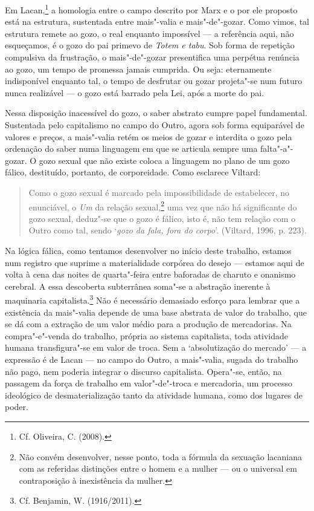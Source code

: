 Em Lacan,\footnote{Cf. Oliveira, C. (2008).} a homologia entre o campo
descrito por Marx e o por ele proposto está na estrutura, sustentada
entre mais"-valia e mais"-de"-gozar. Como vimos, tal estrutura remete ao
gozo, o real enquanto impossível --- a referência aqui, não esqueçamos, é
o gozo do pai primevo de \emph{Totem e tabu}. Sob forma de repetição
compulsiva da frustração, o mais"-de"-gozar presentifica uma perpétua
renúncia ao gozo, um tempo de promessa jamais cumprida. Ou seja:
eternamente indisponível enquanto tal, o tempo de desfrutar ou gozar
projeta"-se num futuro nunca realizável --- o gozo está barrado pela Lei,
após a morte do pai.

Nessa disposição inacessível do gozo, o saber abstrato cumpre papel
fundamental. Sustentada pelo capitalismo no campo do Outro, agora sob
forma equiparável de valores e preços, a mais"-valia retém os meios de
gozar e interdita o gozo pela ordenação do saber numa linguagem em que
se articula sempre uma falta"-a"-gozar. O gozo sexual que não existe
coloca a linguagem no plano de um gozo fálico, destituído, portanto, de
corporeidade. Como esclarece Viltard:

\begin{quote}
Como o gozo sexual é marcado pela impossibilidade de estabelecer, no
enunciável, o \emph{Um} da relação sexual,\footnote{Não convém
  desenvolver, nesse ponto, toda a fórmula da sexuação lacaniana com as
  referidas distinções entre o homem e a mulher --- ou o universal em
  contraposição à inexistência da mulher.} uma vez que não há
significante do gozo sexual, deduz"-se que o gozo é fálico, isto é, não
tem relação com o Outro como tal, sendo `\emph{gozo da fala, fora do
corpo}'. (Viltard, 1996, p. 223).
\end{quote}

Na lógica fálica, como tentamos desenvolver no início deste trabalho,
estamos num registro que suprime a materialidade corpórea do desejo ---
estamos aqui de volta à cena das noites de quarta"-feira entre baforadas
de charuto e onanismo cerebral. A essa descoberta subterrânea soma"-se a
abstração inerente à maquinaria capitalista.\footnote{Cf. Benjamin, W.
  (1916/2011).} Não é necessário demasiado esforço para lembrar que a
existência da mais"-valia depende de uma base abstrata de valor do
trabalho, que se dá com a extração de um valor médio para a produção de
mercadorias. Na compra"-e"-venda do trabalho, própria ao sistema
capitalista, toda atividade humana transfigura"-se em valor de troca. Sem
a `absolutização do mercado' --- a expressão é de Lacan --- no campo do
Outro, a mais"-valia, sugada do trabalho não pago, nem poderia integrar o
discurso capitalista. Opera"-se, então, na passagem da força de trabalho
em valor"-de"-troca e mercadoria, um processo ideológico de
desmaterialização tanto da atividade humana, como dos lugares de poder.

